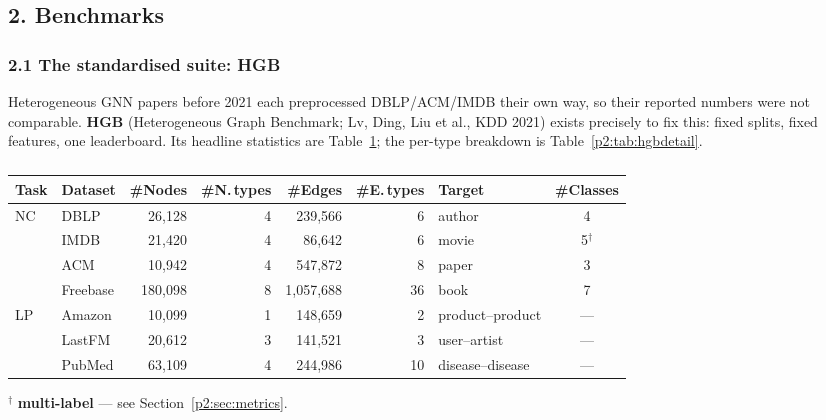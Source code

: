 \newcommand{\pTwoTgt}{orange!22}
\newcommand{\pTwoAgt}{blue!12}
\newcommand{\pTwoAtt}{green!14}
\newcommand{\pTwoVen}{purple!12}

\subsection*{2. Benchmarks}

\subsubsection*{2.1 The standardised suite: HGB}

Heterogeneous GNN papers before 2021 each preprocessed DBLP/ACM/IMDB their own way, so their
reported numbers were not comparable. \textbf{HGB} (Heterogeneous Graph Benchmark; Lv, Ding, Liu
et al., KDD 2021) exists precisely to fix this: fixed splits, fixed features, one leaderboard.
Its headline statistics are Table~\ref{p2:tab:hgb}; the per-type breakdown is
Table~\ref{p2:tab:hgbdetail}.

\begin{table}[htbp]
\centering
\small
\caption{}
\label{p2:tab:hgb}
\begin{tabular}{llrrrrlc}
\toprule
Task & Dataset & \#Nodes & \#N.\,types & \#Edges & \#E.\,types & Target & \#Classes \\
\midrule
\multirow{4}{*}{NC}
 & DBLP     & 26{,}128  & 4 & 239{,}566   & 6  & author  & 4 \\
 & IMDB     & 21{,}420  & 4 & 86{,}642    & 6  & movie   & 5$^{\dagger}$ \\
 & ACM      & 10{,}942  & 4 & 547{,}872   & 8  & paper   & 3 \\
 & Freebase & 180{,}098 & 8 & 1{,}057{,}688 & 36 & book  & 7 \\
\midrule
\multirow{3}{*}{LP}
 & Amazon   & 10{,}099  & 1 & 148{,}659   & 2  & product--product & --- \\
 & LastFM   & 20{,}612  & 3 & 141{,}521   & 3  & user--artist     & --- \\
 & PubMed   & 63{,}109  & 4 & 244{,}986   & 10 & disease--disease & --- \\
\bottomrule
\end{tabular}

\vspace{2pt}
{\footnotesize $^{\dagger}$ \textbf{multi-label} --- see Section~\ref{p2:sec:metrics}.}
\end{table}

